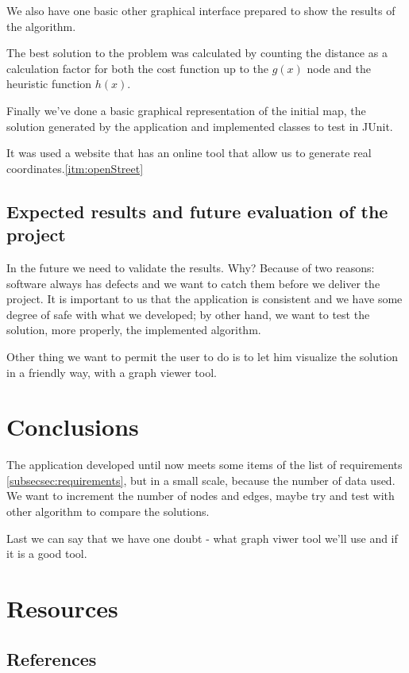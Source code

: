 \documentclass[a4paper]{article}
\begin{document}
We also have one basic other graphical interface prepared to show the results of the algorithm.


The best solution to the problem was calculated by counting the distance as a calculation factor for both the cost function up to the $g(x)$ node and the heuristic function $h(x)$. 

Finally we've done a basic graphical representation of the initial map, the solution generated by the application and implemented classes to test in JUnit.

It was used a website that has an online tool that allow us to generate real coordinates.\ref{itm:openStreet}

\subsection{Expected results and future evaluation of the project}

In the future we need to validate the results. Why? Because of two reasons: software always has defects and we want to catch them before we deliver the project. It is important to us that the application is consistent and we have some degree of safe with what we developed; by other hand, we want to test the solution, more properly, the implemented algorithm. 

Other thing we want to permit the user to do is to let him visualize the solution in a friendly way, with a graph viewer tool.

\section{Conclusions} 

The application developed until now meets some items of the list of requirements \ref{subsecsec:requirements}, but in a small scale, because the number of data used. We want to increment the number of nodes and edges, maybe try and test with other algorithm to compare the solutions. 

Last we can say that we have one doubt - what graph viwer tool we'll use and if it is a good tool. 

\newpage

\section{Resources}

\subsection{References}
\end{document}
